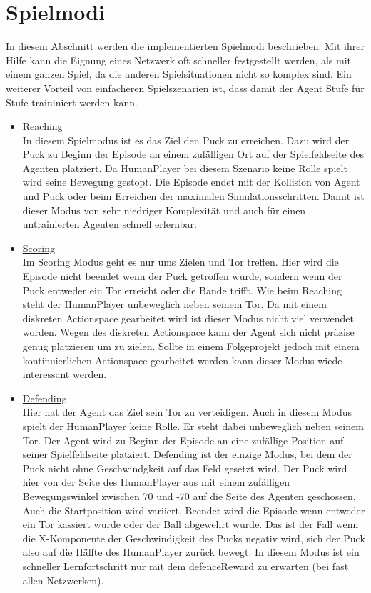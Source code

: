 \section{Spielmodi}
\label{sect:spielmodi}
In diesem Abschnitt werden die implementierten Spielmodi beschrieben. Mit ihrer Hilfe kann die Eignung eines Netzwerk oft schneller festgestellt werden, als mit einem ganzen Spiel, da die anderen Spielsituationen nicht so komplex sind. Ein weiterer Vorteil von einfacheren Spielszenarien ist, dass damit der Agent Stufe für Stufe traininiert werden kann.

\begin{itemize}
\item \underline{Reaching} \\
In diesem Spielmodus ist es das Ziel den Puck zu erreichen. Dazu wird der Puck zu Beginn der Episode an einem zufälligen Ort auf der Spielfeldseite des Agenten platziert. Da HumanPlayer bei diesem Szenario keine Rolle spielt wird seine Bewegung gestopt. Die Episode endet mit der Kollision von Agent und Puck oder beim Erreichen der maximalen Simulationsschritten. Damit ist dieser Modus von sehr niedriger Komplexität und auch für einen untrainierten Agenten schnell erlernbar.

\item \underline{Scoring} \\
Im Scoring Modus geht es nur ums Zielen und Tor treffen. Hier wird die Episode nicht beendet wenn der Puck getroffen wurde, sondern wenn der Puck entweder ein Tor erreicht oder die Bande trifft. Wie beim Reaching steht der HumanPlayer unbeweglich neben seinem Tor. Da mit einem diskreten Actionspace gearbeitet wird ist dieser Modus nicht viel verwendet worden. Wegen des diskreten Actionspace kann der Agent sich nicht präzise genug platzieren um zu zielen. Sollte in einem Folgeprojekt jedoch mit einem kontinuierlichen Actionspace gearbeitet werden kann dieser Modus wiede interessant werden.

\item \underline{Defending} \\
Hier hat der Agent das Ziel sein Tor zu verteidigen. Auch in diesem Modus spielt der HumanPlayer keine Rolle. Er steht dabei unbeweglich neben seinem Tor. Der Agent wird zu Beginn der Episode an eine zufällige Position auf seiner Spielfeldseite platziert. Defending ist der einzige Modus, bei dem der Puck nicht ohne Geschwindgkeit auf das Feld gesetzt wird. Der Puck wird hier von der Seite des HumanPlayer aus mit einem zufälligen Bewegungswinkel zwischen 70 und -70 auf die Seite des Agenten geschossen. Auch die Startposition wird variiert. Beendet wird die Episode wenn entweder ein Tor kassiert wurde oder der Ball abgewehrt wurde. Das ist der Fall wenn die X-Komponente der Geschwindigkeit des Pucks negativ wird, sich der Puck also auf die Hälfte des HumanPlayer zurück bewegt. In diesem Modus ist ein schneller Lernfortschritt nur mit dem defenceReward zu erwarten (bei fast allen Netzwerken).


\end{itemize}

